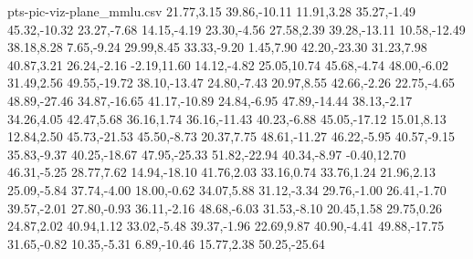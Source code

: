 \begin{filecontents*}[overwrite]{pts-pic-viz-plane_mmlu.csv}
21.77,3.15
39.86,-10.11
11.91,3.28
35.27,-1.49
45.32,-10.32
23.27,-7.68
14.15,-4.19
23.30,-4.56
27.58,2.39
39.28,-13.11
10.58,-12.49
38.18,8.28
7.65,-9.24
29.99,8.45
33.33,-9.20
1.45,7.90
42.20,-23.30
31.23,7.98
40.87,3.21
26.24,-2.16
-2.19,11.60
14.12,-4.82
25.05,10.74
45.68,-4.74
48.00,-6.02
31.49,2.56
49.55,-19.72
38.10,-13.47
24.80,-7.43
20.97,8.55
42.66,-2.26
22.75,-4.65
48.89,-27.46
34.87,-16.65
41.17,-10.89
24.84,-6.95
47.89,-14.44
38.13,-2.17
34.26,4.05
42.47,5.68
36.16,1.74
36.16,-11.43
40.23,-6.88
45.05,-17.12
15.01,8.13
12.84,2.50
45.73,-21.53
45.50,-8.73
20.37,7.75
48.61,-11.27
46.22,-5.95
40.57,-9.15
35.83,-9.37
40.25,-18.67
47.95,-25.33
51.82,-22.94
40.34,-8.97
-0.40,12.70
46.31,-5.25
28.77,7.62
14.94,-18.10
41.76,2.03
33.16,0.74
33.76,1.24
21.96,2.13
25.09,-5.84
37.74,-4.00
18.00,-0.62
34.07,5.88
31.12,-3.34
29.76,-1.00
26.41,-1.70
39.57,-2.01
27.80,-0.93
36.11,-2.16
48.68,-6.03
31.53,-8.10
20.45,1.58
29.75,0.26
24.87,2.02
40.94,1.12
33.02,-5.48
39.37,-1.96
22.69,9.87
40.90,-4.41
49.88,-17.75
31.65,-0.82
10.35,-5.31
6.89,-10.46
15.77,2.38
50.25,-25.64
\end{filecontents*}
